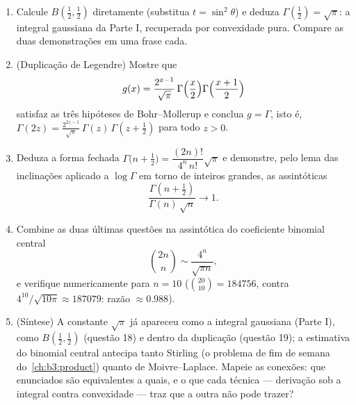 \begin{problem}
\begin{enumerate}[resume]
        integral dupla.
  \item Calcule $B(\frac12, \frac12)$ diretamente (substitua $t
        = \sin^2\theta$) e deduza $\Gamma(\frac12) =
        \sqrt\pi$: a
        integral gaussiana da Parte I, recuperada por convexidade pura.
        Compare as duas demonstrações em uma frase cada.
  \item (Duplicação de Legendre) Mostre que
        \[
        g(x) = \frac{2^{x-1}}{\sqrt\pi}\,
        \Gamma\Bigl(\frac x2\Bigr)
        \Gamma\Bigl(\frac{x+1}2\Bigr)
        \]
        satisfaz as três hipóteses de Bohr--Mollerup e conclua $g = \Gamma$,
        isto é, $\Gamma(2z) =
        \frac{2^{2z-1}}{\sqrt\pi}\,\Gamma(z)\,\Gamma(z +
        \tfrac12)$ para todo $z > 0$.
  \item Deduza a forma fechada $\Gamma\bigl(n + \tfrac12\bigr)
        = \dfrac{(2n)!}{4^n\,n!}\sqrt\pi$ e demonstre, pelo lema das
        inclinações aplicado a $\log\Gamma$ em torno de inteiros grandes, as
        assintóticas
        \[
        \frac{\Gamma(n + \frac12)}{\Gamma(n)\,\sqrt n}
        \longrightarrow 1 .
        \]
  \item Combine as duas últimas questões na assintótica do coeficiente
        binomial central
        \[
        \binom{2n}{n} \sim \frac{4^n}{\sqrt{\pi n}},
        \]
        e verifique numericamente para $n = 10$ ($\binom{20}{10} =
        184756$, contra
        $4^{10}/\sqrt{10\pi} \approx
        187079$: razão $\approx 0.988$).
  \item (Síntese) A constante $\sqrt\pi$ já apareceu como a integral
        gaussiana (Parte I), como $B(\frac12,
        \frac12)$ (questão 18) e dentro da
        duplicação (questão 19); a estimativa do binomial central
        antecipa tanto Stirling (o problema de fim de semana do~\cref{ch:b3:product}) quanto de Moivre--Laplace. Mapeie as conexões:
        que enunciados são equivalentes a quais, e o que cada técnica
        --- derivação sob a integral contra convexidade --- traz que a
        outra não pode trazer?
\end{enumerate}


\end{problem}
